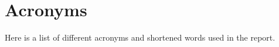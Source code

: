 \section*{Acronyms}

Here is a list of different acronyms and shortened words used in the report.

\begin{acronym}


\end{acronym}